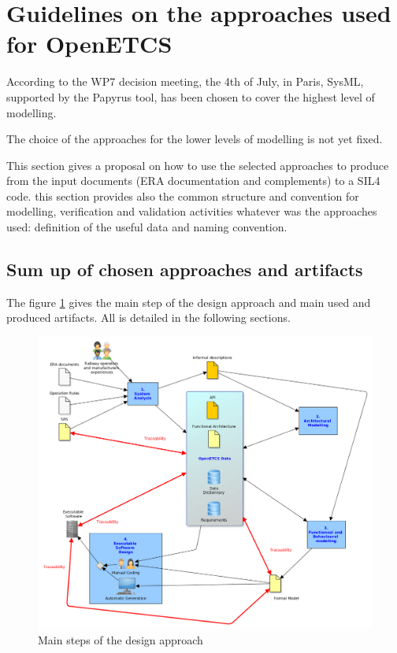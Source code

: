 
\section{Guidelines on the approaches used for OpenETCS}
\label{sec:guideline}


According to  the WP7 decision meeting, the 4th of July, in Paris, SysML, supported by the Papyrus tool,  has been chosen to  cover the highest level of modelling.

The choice of the approaches for the lower levels of modelling is not yet fixed.

This section gives a proposal on how to use the selected approaches to produce from the input documents (ERA documentation and complements)  to a SIL4 code. this section provides also the common structure and convention for modelling, verification and validation activities whatever was the approaches used: definition of the useful data and naming convention.

\subsection{Sum up of chosen approaches and artifacts}

The figure \ref{fig:Steps} gives the main step of the design approach and main used and produced artifacts. All is detailed in the following sections.

\begin{figure}[ht]
  \centering
  \includegraphics[width=\textwidth]{images/Step.png}
  \caption{Main steps of the design approach}
  \label{fig:Steps}
\end{figure}


